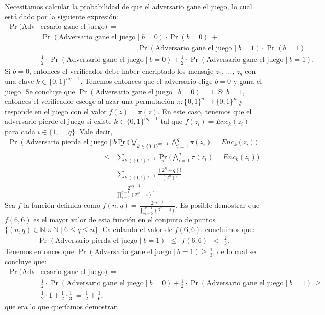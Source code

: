 \documentclass[11pt]{article}
\begin{document}
Necesitamos calcular la probabilidad de que el adversario gane el
juego, lo cual está dado por la siguiente expresión:
\begin{align*}
  \Pr(\text{Adv}&\text{ersario gane el juego}) \ =\\
  &\Pr(\text{Adversario gane el juego} \mid b=0) \cdot \Pr(b=0) \ +\\
  &\hspace{162pt} \Pr(\text{Adversario gane el juego} \mid b=1) \cdot \Pr(b=1) \ =\\
  &\frac{1}{2} \cdot \Pr(\text{Adversario gane el juego} \mid b=0) + \frac{1}{2} \cdot \Pr(\text{Adversario gane el juego} \mid b=1).
\end{align*}
Si $b = 0$, entonces el verificador debe haber encriptado los mensaje
$z_1$, $\ldots$, $z_q$ con una clave $k \in \{0,1\}^{nq-1}$. Tenemos
entonces que el adversario elige $b = 0$ y gana el juego. Se concluye
que $ \Pr(\text{Adversario gane el juego} \mid b=0) = 1$.  Si $b = 1$,
entonces el verificador escoge al azar una permutación $\pi :
\{0,1\}^n \to \{0,1\}^n$ y responde en el juego con el valor $f(z) =
\pi(z)$. En este caso, tenemos que el adversario pierde el juego si
existe $k \in \{0,1\}^{nq-1}$ tal que $f(z_i) = \textit{Enc}_k(z_i)$
para cada $i \in \{1, \ldots, q\}$. Vale decir,
\begin{eqnarray*}
  \Pr(\text{Adversario pierda el juego} \mid b=1) &=&
  \Pr_{\pi}\bigg(\bigvee_{k \in \{0,1\}^{nq-1}} \bigwedge_{i=1}^q \pi(z_i) = \textit{Enc}_k(z_i)\bigg)\\
  & \leq &  \sum_{k \in \{0,1\}^{nq-1}} \Pr_{\pi}\bigg(\bigwedge_{i=1}^q \pi(z_i) = \textit{Enc}_k(z_i)\bigg)\\
  &=& \sum_{k \in \{0,1\}^{nq-1}} \frac{(2^n - q)!}{(2^n)!}\\
  &=& \frac{2^{nq - 1}}{{\displaystyle \prod_{i=0}^{q-1} (2^n - i)}}.
\end{eqnarray*}
Sea $f$ la función definida como $f(n, q) = \frac{2^{nq -
    1}}{\prod_{i=0}^{q-1} (2^n - i)}$. Es posible
demostrar que $f(6, 6)$ es el mayor valor de esta función en el
conjunto de puntos $\{ (n,q) \in \mathbb{N} \times \mathbb{N} \mid 6 \leq q \leq n\}$. Calculando el
valor de $f(6, 6)$, concluimos que:
\begin{eqnarray*}
  \Pr(\text{Adversario pierda el juego} \mid b=1) \ \ \leq \ \ f(6, 6) \ \ < \ \ \frac{2}{3}.
\end{eqnarray*}
Tenemos entonces que $\Pr(\text{Adversario gane el juego} \mid b=1) \geq \frac{1}{3}$, de lo cual se concluye que:
\begin{align*}
  \Pr(\text{Adv}&\text{ersario gane el juego}) \ =\\
  &\frac{1}{2} \cdot \Pr(\text{Adversario gane el juego} \mid b=0) + \frac{1}{2} \cdot \Pr(\text{Adversario gane el juego} \mid b=1) \ \geq\\
  &\frac{1}{2} \cdot 1 + \frac{1}{2} \cdot \frac{1}{3} \ = \ \frac{1}{2} + \frac{1}{6},
\end{align*}
que era lo que queríamos demostrar.
  
\end{document}
